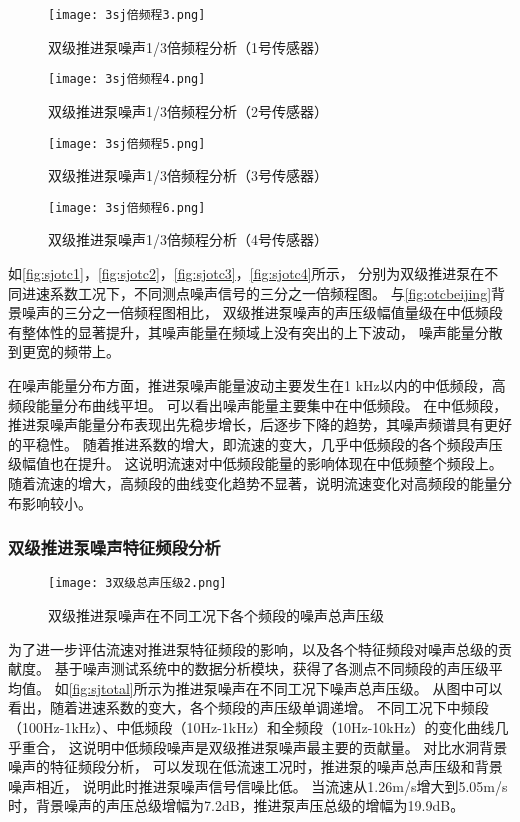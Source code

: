 \begin{figure}[htbp]
    \centering
    \texttt{[image: 3sj倍频程3.png]}
    \caption{\label{fig:sjotc1}双级推进泵噪声1/3倍频程分析（1号传感器）}
\end{figure}
\begin{figure}[htbp]
    \centering
    \texttt{[image: 3sj倍频程4.png]}
    \caption{\label{fig:sjotc2}双级推进泵噪声1/3倍频程分析（2号传感器）}
\end{figure}
\begin{figure}[htbp]
    \centering
    \texttt{[image: 3sj倍频程5.png]}
    \caption{\label{fig:sjotc3}双级推进泵噪声1/3倍频程分析（3号传感器）}
\end{figure}
\begin{figure}[htbp]
    \centering
    \texttt{[image: 3sj倍频程6.png]}
    \caption{\label{fig:sjotc4}双级推进泵噪声1/3倍频程分析（4号传感器）}
\end{figure}

如\autoref{fig:sjotc1}，\autoref{fig:sjotc2}，\autoref{fig:sjotc3}，\autoref{fig:sjotc4}所示，
分别为双级推进泵在不同进速系数工况下，不同测点噪声信号的三分之一倍频程图。
与\autoref{fig:otcbeijing}背景噪声的三分之一倍频程图相比，
双级推进泵噪声的声压级幅值量级在中低频段有整体性的显著提升，其噪声能量在频域上没有突出的上下波动，
噪声能量分散到更宽的频带上。

在噪声能量分布方面，推进泵噪声能量波动主要发生在1 kHz以内的中低频段，高频段能量分布曲线平坦。
可以看出噪声能量主要集中在中低频段。
在中低频段，推进泵噪声能量分布表现出先稳步增长，后逐步下降的趋势，其噪声频谱具有更好的平稳性。
随着推进系数的增大，即流速的变大，几乎中低频段的各个频段声压级幅值也在提升。
这说明流速对中低频段能量的影响体现在中低频整个频段上。
随着流速的增大，高频段的曲线变化趋势不显著，说明流速变化对高频段的能量分布影响较小。

\subsubsection{双级推进泵噪声特征频段分析}
\begin{figure}[htbp]
    \centering
    \texttt{[image: 3双级总声压级2.png]}
    \caption{\label{fig:sjtotal}双级推进泵噪声在不同工况下各个频段的噪声总声压级}
\end{figure}

为了进一步评估流速对推进泵特征频段的影响，以及各个特征频段对噪声总级的贡献度。
基于噪声测试系统中的数据分析模块，获得了各测点不同频段的声压级平均值。
如\autoref{fig:sjtotal}所示为推进泵噪声在不同工况下噪声总声压级。
从图中可以看出，随着进速系数的变大，各个频段的声压级单调递增。
不同工况下中频段（100Hz-1kHz）、中低频段（10Hz-1kHz）和全频段（10Hz-10kHz）的变化曲线几乎重合，
这说明中低频段噪声是双级推进泵噪声最主要的贡献量。
对比水洞背景噪声的特征频段分析，
可以发现在低流速工况时，推进泵的噪声总声压级和背景噪声相近，
说明此时推进泵噪声信号信噪比低。
当流速从1.26m/s增大到5.05m/s时，背景噪声的声压总级增幅为7.2dB，推进泵声压总级的增幅为19.9dB。

